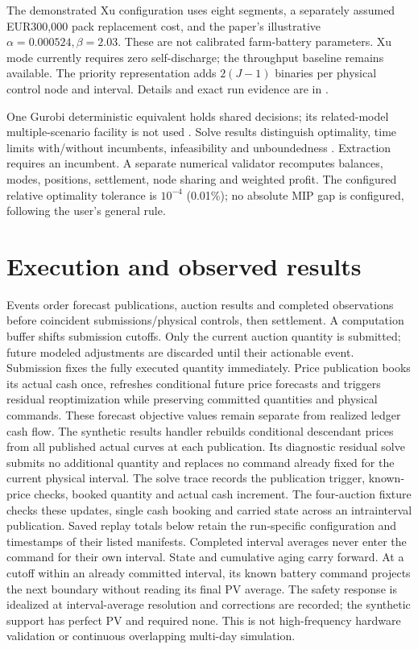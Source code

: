 \documentclass[11pt,a4paper]{article}
\begin{document}
The demonstrated Xu configuration uses eight segments, a separately assumed
EUR300,000 pack replacement cost, and the paper's illustrative
$\alpha=0.000524,\beta=2.03$. These are not calibrated farm-battery parameters.
Xu mode currently requires zero self-discharge; the throughput baseline remains
available. The priority representation adds $2(J-1)$ binaries per physical control
node and interval. Details and exact run evidence are in .

One Gurobi deterministic equivalent holds shared decisions; its related-model
multiple-scenario facility is not used \cite{gurobi_scenarios}. Solve results distinguish
optimality, time limits with/without incumbents, infeasibility and unboundedness
\cite{gurobi_status}. Extraction requires an incumbent. A separate numerical validator
recomputes balances, modes, positions, settlement, node sharing and weighted profit.
The configured relative optimality tolerance is $10^{-4}$ (0.01\%); no absolute
MIP gap is configured, following the user's general rule.

\section{Execution and observed results}
Events order forecast publications, auction results and completed observations
before coincident submissions/physical controls, then settlement. A computation
buffer shifts submission cutoffs. Only the current auction quantity is submitted;
future modeled adjustments are discarded until their actionable event. Submission
fixes the fully executed quantity immediately. Price publication books its actual
cash once, refreshes conditional future price forecasts and triggers residual
reoptimization while preserving committed quantities and physical commands.
These forecast objective values remain separate from realized ledger cash flow.
The synthetic results handler rebuilds conditional descendant prices from all
published actual curves at each publication. Its diagnostic residual solve
submits no additional quantity and replaces no command already fixed for the
current physical interval. The solve trace records the publication trigger,
known-price checks, booked quantity and actual cash increment. The four-auction
fixture checks these updates, single cash booking and carried state across an
intrainterval publication. Saved replay totals below retain the run-specific
configuration and timestamps of their listed manifests.
Completed interval averages never enter the
command for their own interval. State and cumulative aging carry forward.
At a cutoff within an already committed interval, its known battery command
projects the next boundary without reading its final PV average. The safety
response is idealized at interval-average resolution and corrections are recorded;
the synthetic support has perfect PV and required none. This is not high-frequency
hardware validation or continuous overlapping multi-day simulation.
\end{document}
